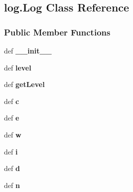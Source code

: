 \hypertarget{classlog_1_1_log}{\subsection{log.\-Log Class Reference}
\label{classlog_1_1_log}
}
\subsubsection*{Public Member Functions}
\begin{DoxyCompactItemize}
\item 
\hypertarget{classlog_1_1_log_a34c3a293ac13dafb0920e3ed9ce12f9e}{def {\bfseries \-\_\-\-\_\-init\-\_\-\-\_\-}}\label{classlog_1_1_log_a34c3a293ac13dafb0920e3ed9ce12f9e}

\item 
\hypertarget{classlog_1_1_log_a8fa9c74a278b0fe97a1cc6641861722d}{def {\bfseries level}}\label{classlog_1_1_log_a8fa9c74a278b0fe97a1cc6641861722d}

\item 
\hypertarget{classlog_1_1_log_acc0678ddeab32df783b1e0d172b29082}{def {\bfseries get\-Level}}\label{classlog_1_1_log_acc0678ddeab32df783b1e0d172b29082}

\item 
\hypertarget{classlog_1_1_log_ae915f95869d2839f42f0de8387d11987}{def {\bfseries c}}\label{classlog_1_1_log_ae915f95869d2839f42f0de8387d11987}

\item 
\hypertarget{classlog_1_1_log_a37397ea7183e194e289bad1aa5211292}{def {\bfseries e}}\label{classlog_1_1_log_a37397ea7183e194e289bad1aa5211292}

\item 
\hypertarget{classlog_1_1_log_ac88cf5dd0c7f8501f2c283403f148bf0}{def {\bfseries w}}\label{classlog_1_1_log_ac88cf5dd0c7f8501f2c283403f148bf0}

\item 
\hypertarget{classlog_1_1_log_a6a6afff0318323603960f0fb97a3d66d}{def {\bfseries i}}\label{classlog_1_1_log_a6a6afff0318323603960f0fb97a3d66d}

\item 
\hypertarget{classlog_1_1_log_ad6426a4b93f68df70f6e1e5a867f3857}{def {\bfseries d}}\label{classlog_1_1_log_ad6426a4b93f68df70f6e1e5a867f3857}

\item 
\hypertarget{classlog_1_1_log_a9a9a837544b793e1e388d62f1e37fb52}{def {\bfseries n}}\label{classlog_1_1_log_a9a9a837544b793e1e388d62f1e37fb52}

\end{DoxyCompactItemize}
